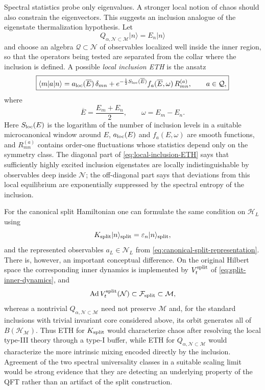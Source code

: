 \documentclass[a4paper,11pt]{article}
\theoremstyle{definition}
\newcommand{\mN}{\mathcal{N}}
\newcommand{\mH}{\mathcal{H}}
\newcommand{\mM}{\mathcal{M}}
\newcommand{\Ad}{\operatorname{Ad}}
\begin{document}
Spectral statistics probe only eigenvalues.  A stronger local notion of chaos should also constrain the eigenvectors.  This suggests an inclusion analogue of the eigenstate thermalization hypothesis.  Let
\begin{equation}
    Q_{\alpha,\mN\subset\mM}|n\rangle=E_n|n\rangle
\end{equation}
and choose an algebra $\mathcal Q\subset\mN$ of observables localized well inside the inner region, so that the operators being tested are separated from the collar where the inclusion is defined.  A possible \emph{local inclusion ETH} is the ansatz
\begin{equation}
    \boxed{
    \langle m|a|n\rangle
    =
    a_{\rm loc}(\overline E)\,\delta_{mn}
    +
    e^{-\frac12 S_{\rm loc}(\overline E)}
    f_a(\overline E,\omega)\,
    R^{(a)}_{mn},
    \qquad
    a\in\mathcal Q ,
    }
    \label{eq:local-inclusion-ETH}
\end{equation}
where
\begin{equation}
    \overline E=\frac{E_m+E_n}{2},
    \qquad
    \omega=E_m-E_n.
\end{equation}
Here $S_{\rm loc}(E)$ is the logarithm of the number of inclusion levels in a suitable microcanonical window around $E$, $a_{\rm loc}(E)$ and $f_a(E,\omega)$ are smooth functions, and $R^{(a)}_{mn}$ contains order-one fluctuations whose statistics depend only on the symmetry class.  The diagonal part of \eqref{eq:local-inclusion-ETH} says that sufficiently highly excited inclusion eigenstates are locally indistinguishable by observables deep inside $\mN$; the off-diagonal part says that deviations from this local equilibrium are exponentially suppressed by the spectral entropy of the inclusion.

For the canonical split Hamiltonian one can formulate the same condition on $\mathcal H_L$ using
\begin{equation}
    K_{\rm split}|n\rangle_{\rm split}
    =
    \varepsilon_n|n\rangle_{\rm split},
\end{equation}
and the represented observables $a_L\in\mN_L$ from \eqref{eq:canonical-split-representation}. There is, however, an important conceptual difference. On the original Hilbert space the corresponding inner dynamics is implemented by $V_t^{\rm split}$ of \eqref{eq:split-inner-dynamics}, and
\begin{equation}
    \Ad V_t^{\rm split}(\mN)
    \subset\mathcal F_{\rm split}\subset\mM,
\end{equation}
whereas a nontrivial $Q_{\alpha,\mN\subset\mM}$ need not preserve $\mM$ and, for the standard inclusions with trivial invariant core considered above, its orbit generates all of $B(\mH_{\mM})$.  Thus ETH for $K_{\rm split}$ would characterize chaos after resolving the local type-III theory through a type-I buffer, while ETH for $Q_{\alpha,\mN\subset\mM}$ would characterize the more intrinsic mixing encoded directly by the inclusion.  Agreement of the two spectral universality classes in a suitable scaling limit would be strong evidence that they are detecting an underlying property of the QFT rather than an artifact of the split construction.
\end{document}
